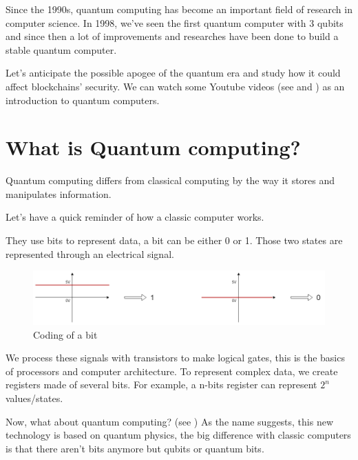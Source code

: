 Since the 1990s, quantum computing has become an important field of research in computer science. In 1998, we've seen the first quantum computer with 3 qubits and since then a lot of improvements and researches have been done to build a stable quantum computer. \newline

Let's anticipate the possible apogee of the quantum era and study how it could affect blockchains' security. We can watch some Youtube videos (see \cite{scienceEtonnante} and \cite{confTedEd}) as an introduction to quantum computers.

\section{What is Quantum computing?}

Quantum computing differs from classical computing by the way it stores and manipulates information. \newline

Let's have a quick reminder of how a classic computer works. \newline

They use bits to represent data, a bit can be either 0 or 1. Those two states are represented through an electrical signal. \newline

\begin{figure}[ht]
\centering
\includegraphics[width=14cm]{Figures/electricSignals}
\caption{Coding of a bit}
\end{figure}
\medskip

We process these signals with transistors to make logical gates, this is the basics of processors and computer architecture. To represent complex data, we create registers made of several bits. For example, a n-bits register can represent $2^n$ values/states. \newline

Now, what about quantum computing? (see \cite{qubitWiki}) As the name suggests, this new technology is based on quantum physics, the big difference with classic computers is that there aren't bits anymore but qubits or quantum bits. \newline

